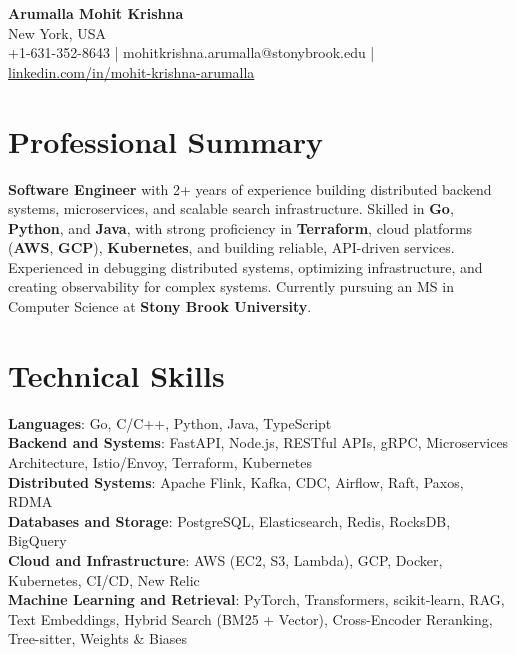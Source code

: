\documentclass[letterpaper,11pt]{article}
\begin{document}
\begin{center}
  {\Large \textbf{Arumalla Mohit Krishna}} \\
  New York, USA \\
  +1-631-352-8643 \enspace | \enspace mohitkrishna.arumalla@stonybrook.edu \enspace | \enspace \href{https://www.linkedin.com/in/mohit-krishna-arumalla}{linkedin.com/in/mohit-krishna-arumalla}
\end{center}

\section{Professional Summary}
  \begin{itemize}[leftmargin=0.15in, label={}]
    \small{\item{
     \textbf{Software Engineer} with 2+ years of experience building distributed backend systems, microservices, and scalable search infrastructure. Skilled in \textbf{Go}, \textbf{Python}, and \textbf{Java}, with strong proficiency in \textbf{Terraform}, cloud platforms (\textbf{AWS}, \textbf{GCP}), \textbf{Kubernetes}, and building reliable, API-driven services. Experienced in debugging distributed systems, optimizing infrastructure, and creating observability for complex systems. Currently pursuing an MS in Computer Science at \textbf{Stony Brook University}.
    }}
  \end{itemize}
\vspace{-16pt}

\section{Technical Skills}
 \begin{itemize}[leftmargin=0.15in, label={}]
    \small{\item{
     \textbf{Languages}: Go, C/C++, Python, Java, TypeScript \\
     \textbf{Backend and Systems}: FastAPI, Node.js, RESTful APIs, gRPC, Microservices Architecture, Istio/Envoy, Terraform, Kubernetes \\
     \textbf{Distributed Systems}: Apache Flink, Kafka, CDC, Airflow, Raft, Paxos, RDMA \\
     \textbf{Databases and Storage}: PostgreSQL, Elasticsearch, Redis, RocksDB, BigQuery \\
     \textbf{Cloud and Infrastructure}: AWS (EC2, S3, Lambda), GCP, Docker, Kubernetes, CI/CD, New Relic \\
     \textbf{Machine Learning and Retrieval}: PyTorch, Transformers, scikit-learn, RAG, Text Embeddings, Hybrid Search (BM25 + Vector), Cross-Encoder Reranking, Tree-sitter, Weights \& Biases
    }}
 \end{itemize}
\vspace{-16pt}
\end{document}
